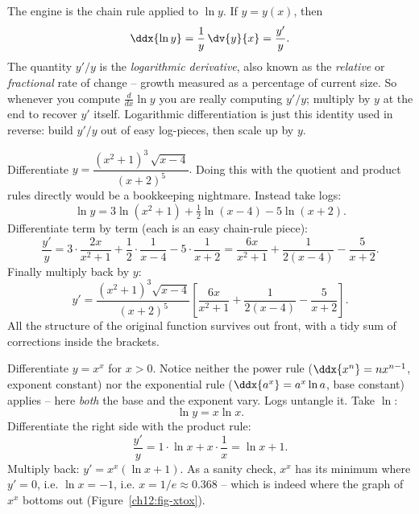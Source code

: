\begin{whybox}
The engine is the chain rule applied to $\ln y$. If $y=y(x)$, then
\[
   \ddx{\ln y} = \frac{1}{y}\,\dv{y}{x} = \frac{y'}{y}.
\]
The quantity $y'/y$ is the \emph{logarithmic derivative}, also known as the
\emph{relative} or \emph{fractional} rate of change -- growth measured as a
percentage of current size. So whenever you compute $\frac{d}{dx}\ln y$ you
are really computing $y'/y$; multiply by $y$ at the end to recover $y'$
itself. Logarithmic differentiation is just this identity used in reverse:
build $y'/y$ out of easy log-pieces, then scale up by $y$.
\end{whybox}

\begin{example}
\label{ch12:ex-logdiff-product}
Differentiate
\(
   y = \dfrac{(x^2+1)^3\,\sqrt{x-4}}{(x+2)^5}.
\)
Doing this with the quotient and product rules directly would be a
bookkeeping nightmare. Instead take logs:
\[
   \ln y = 3\ln(x^2+1) + \tfrac12\ln(x-4) - 5\ln(x+2).
\]
Differentiate term by term (each is an easy chain-rule piece):
\[
   \frac{y'}{y}
   = 3\cdot\frac{2x}{x^2+1} + \frac12\cdot\frac{1}{x-4} - 5\cdot\frac{1}{x+2}
   = \frac{6x}{x^2+1} + \frac{1}{2(x-4)} - \frac{5}{x+2}.
\]
Finally multiply back by $y$:
\[
   y' = \frac{(x^2+1)^3\sqrt{x-4}}{(x+2)^5}
        \left[\frac{6x}{x^2+1} + \frac{1}{2(x-4)} - \frac{5}{x+2}\right].
\]
All the structure of the original function survives out front, with a tidy
sum of corrections inside the brackets.
\end{example}

\begin{example}
\label{ch12:ex-tower}
Differentiate $y = x^x$ for $x>0$. Notice neither the power rule
($\ddx{x^n}=nx^{n-1}$, exponent constant) nor the exponential rule
($\ddx{a^x}=a^x\ln a$, base constant) applies -- here \emph{both} the base
and the exponent vary. Logs untangle it. Take $\ln$:
\[
   \ln y = x\ln x.
\]
Differentiate the right side with the product rule:
\[
   \frac{y'}{y} = 1\cdot \ln x + x\cdot\frac1x = \ln x + 1.
\]
Multiply back: $y' = x^x(\ln x + 1)$. As a sanity check, $x^x$ has its
minimum where $y'=0$, i.e. $\ln x = -1$, i.e. $x = 1/e \approx 0.368$ --
which is indeed where the graph of $x^x$ bottoms out
(Figure~\ref{ch12:fig-xtox}).
\end{example}


